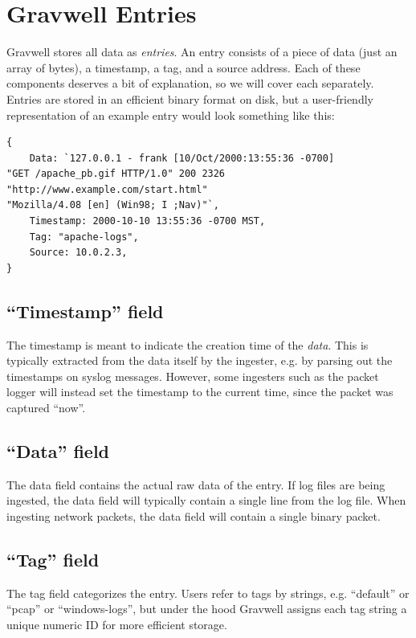 \section{Gravwell Entries}

Gravwell stores all data as \emph{entries}. An entry consists of a piece of data (just an array of bytes), a timestamp, a tag, and a source address. Each of these components deserves a bit of explanation, so we will cover each separately. Entries are stored in an efficient binary format on disk, but a user-friendly representation of an example entry would look something like this:

\begin{Verbatim}[breaklines=true]
{
    Data: `127.0.0.1 - frank [10/Oct/2000:13:55:36 -0700] 
"GET /apache_pb.gif HTTP/1.0" 200 2326 "http://www.example.com/start.html" 
"Mozilla/4.08 [en] (Win98; I ;Nav)"`,
    Timestamp: 2000-10-10 13:55:36 -0700 MST,
    Tag: "apache-logs",
    Source: 10.0.2.3,
}
\end{Verbatim}

\subsection{``Timestamp'' field}

The timestamp is meant to indicate the creation time of the \emph{data}. This is typically extracted from the data itself by the ingester, e.g. by parsing out the timestamps on syslog messages. However, some ingesters such as the packet logger will instead set the timestamp to the current time, since the packet was captured ``now''.

\subsection{``Data'' field}

The data field contains the actual raw data of the entry. If log files are being ingested, the data field will typically contain a single line from the log file. When ingesting network packets, the data field will contain a single binary packet.

\subsection{``Tag'' field}

The tag field categorizes the entry. Users refer to tags by strings, e.g. ``default'' or ``pcap'' or ``windows-logs'', but under the hood Gravwell assigns each tag string a unique numeric ID for more efficient storage.

